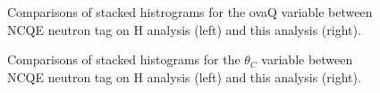 \begin{figure}[!htbp]
    \centering
    
   
     \hfill 
     \par
    
    \caption{Comparisons of stacked histrograms for the ovaQ variable between NCQE neutron tag on H analysis (left) and this analysis (right).} \label{fig:ovaq_reduction}    
\end{figure}

\begin{figure}[!htbp]
    \centering
    
    
    
     \hfill 
     \par
    
    \caption{Comparisons of stacked histograms for the $\theta_C$ variable between NCQE neutron tag on H analysis (left) and this analysis (right).} \label{fig:angle_reduction}    
\end{figure}



